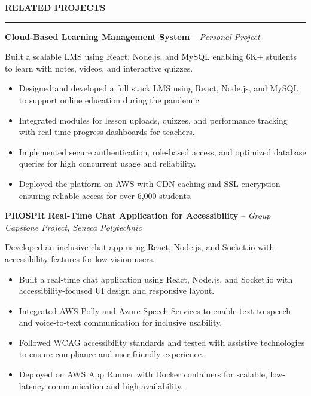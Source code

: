 \documentclass[10pt,letterpaper]{article}
\begin{document}
\vspace{6pt}

\textbf{RELATED PROJECTS}\\[-8pt]
\noindent\rule{\textwidth}{1pt}

\vspace{-2pt}

\textbf{Cloud-Based Learning Management System} -- \emph{Personal Project}

\vspace{-1pt}

Built a scalable LMS using React, Node.js, and MySQL enabling 6K+ students to learn with notes, videos, and interactive quizzes.
\vspace{-1pt}
\begin{itemize}
\item Designed and developed a full stack LMS using React, Node.js, and MySQL to support online education during the pandemic.
\item Integrated modules for lesson uploads, quizzes, and performance tracking with real-time progress dashboards for teachers.
\item Implemented secure authentication, role-based access, and optimized database queries for high concurrent usage and reliability.
\item Deployed the platform on AWS with CDN caching and SSL encryption ensuring reliable access for over 6,000 students.
\end{itemize}

\textbf{PROSPR  Real-Time Chat Application for Accessibility} -- \emph{Group Capstone Project, Seneca Polytechnic}

\vspace{-1pt}

Developed an inclusive chat app using React, Node.js, and Socket.io with accessibility features for low-vision users.
\vspace{-1pt}
\begin{itemize}
\item Built a real-time chat application using React, Node.js, and Socket.io with accessibility-focused UI design and responsive layout.
\item Integrated AWS Polly and Azure Speech Services to enable text-to-speech and voice-to-text communication for inclusive usability.
\item Followed WCAG accessibility standards and tested with assistive technologies to ensure compliance and user-friendly experience.
\item Deployed on AWS App Runner with Docker containers for scalable, low-latency communication and high availability.
\end{itemize}
\end{document}
